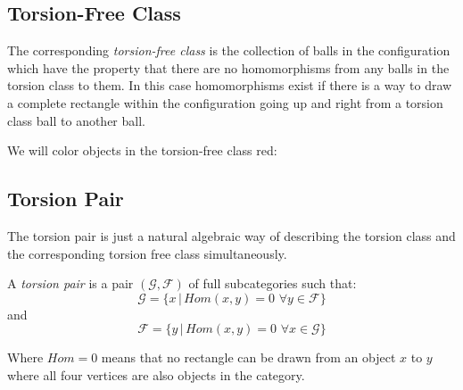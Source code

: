 \documentclass{article}
\begin{document}
\subsection{Torsion-Free Class}
\begin{define}
The corresponding {\it torsion-free class} is the collection of balls in the configuration which have the property that there are no homomorphisms from any balls in the torsion class to them. In this case homomorphisms exist if there is a way to draw a complete rectangle within the configuration going up and right from a torsion class ball to another ball. 
\end{define}
We will color objects in the torsion-free class red:
\begin{center}
\end{center}


\subsection{Torsion Pair}
The torsion pair is just a natural algebraic way of describing the torsion class and the corresponding torsion free class simultaneously.
\begin{define}
 A {\it torsion pair} is a pair $(\mathcal{G},\mathcal{F})$ of full subcategories such that:
$$
\mathcal{G}=\{x\,|\, Hom(x,y)=0\, \, \forall y\in \mathcal{F}\}
$$
and 
$$
\mathcal{F}=\{y\, | \, Hom(x,y)=0\, \, \forall x\in \mathcal{G}\}
$$
\end{define}
Where $Hom=0$ means that no rectangle can be drawn from an object $x$ to $y$ where all four vertices are also objects in the category. 
\end{document}
